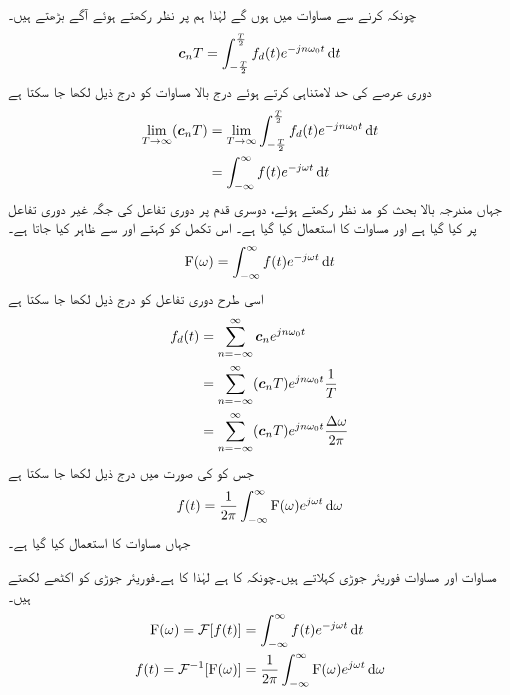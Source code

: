 چونکہ  کرنے سے مساوات  میں  ہوں گے لہٰذا ہم  پر نظر رکھتے ہوئے آگے بڑھتے ہیں۔
\begin{align*}
\kx{c}_n T=\int_{-\frac{T}{2}}^{\frac{T}{2}} f_d(t) e^{-jn\omega_0 t}\dif t
\end{align*}
دوری عرصے کی حد لامتناہی کرتے ہوئے درج بالا مساوات کو درج ذیل لکھا جا سکتا ہے
\begin{align*}
\lim_{T \to \infty} (\kx{c}_n T)&= \lim_{T \to \infty}\int_{-\frac{T}{2}}^{\frac{T}{2}} f_d(t) e^{-jn\omega_0 t}\dif t\\
&=\int_{-\infty}^{\infty} f(t) e^{-j\omega t}\dif t
\end{align*}
جہاں مندرجہ بالا بحث کو مد نظر رکھتے ہوئے، دوسری قدم پر دوری تفاعل  کی جگہ غیر دوری تفاعل پر کیا گیا ہے اور مساوات  کا استعمال کیا گیا ہے۔ اس تکمل کو  کہتے اور  سے ظاہر کیا جاتا ہے۔
\begin{align}\label{مساوات_فوریئر_الف}
\bF(\omega)=\int_{-\infty}^{\infty} f(t) e^{-j\omega t}\dif t
\end{align}
اسی طرح دوری تفاعل کو درج ذیل لکھا جا سکتا ہے
\begin{align*}
f_d(t)&=\sum_{n=-\infty}^{\infty} {{\boldsymbol{c}}}_n e^{jn\omega_0 t}\\
&=\sum_{n=-\infty}^{\infty} ({{\boldsymbol{c}}}_n T) e^{jn\omega_0 t} \frac{1}{T}\\
&=\sum_{n=-\infty}^{\infty} ({{\boldsymbol{c}}}_n T) e^{jn\omega_0 t} \frac{\Delta \omega}{2\pi}
\end{align*}
جس کو  کی صورت میں درج ذیل لکھا جا سکتا ہے
\begin{align}\label{مساوات_فوریئر_ب}
f(t)=\frac{1}{2\pi}\int_{-\infty}^{\infty} \bF(\omega)e^{j\omega t} \dif \omega
\end{align}
جہاں مساوات  کا استعمال کیا گیا ہے۔

مساوات  اور مساوات  فوریئر جوڑی کہلاتے ہیں۔چونکہ  کا   ہے لہٰذا  کا   ہے۔فوریئر جوڑی کو اکٹھے لکھتے ہیں۔
\begin{gather}
\begin{aligned}\label{مساوات_فوریئر_پ}
\bF(\omega)=\Fourier[f(t)]&=\int_{-\infty}^{\infty} f(t) e^{-j\omega t}\dif t\\
f(t)=\Fourier^{-1}[\bF(\omega)]&=\frac{1}{2\pi}\int_{-\infty}^{\infty} \bF(\omega)e^{j\omega t} \dif \omega
\end{aligned}
\end{gather}

